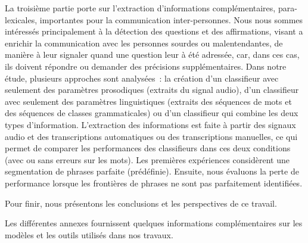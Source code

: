 \documentclass{style/these}
\begin{document}
La troisième partie porte sur l'extraction d'informations complémentaires, para-\linebreak lexicales, importantes pour la communication inter-personnes. 
Nous nous sommes intéressés principalement à la détection des questions et des affirmations, visant a enrichir la communication avec les personnes sourdes ou malentendantes, de manière à leur signaler quand une question leur à été adressée, car, dans ces cas, ils doivent répondre ou demander des précisions supplémentaires. 
Dans notre étude, plusieurs approches sont analysées~: la création d'un classifieur avec seulement des paramètres prosodiques (extraits du signal audio), d'un classifieur avec seulement des paramètres linguistiques (extraits des séquences de mots et des séquences de classes grammaticales) ou d'un classifieur qui combine les deux types d'information. 
L'extraction des informations est faite à partir des signaux audio et des transcriptions automatiques ou des transcriptions manuelles, ce qui permet de comparer les performances des classifieurs dans ces deux conditions (avec ou sans erreurs sur les mots). Les premières expériences considèrent une segmentation de phrases parfaite (prédéfinie). Ensuite, nous
évaluons la perte de performance lorsque les frontières de phrases ne sont pas parfaitement identifiées.

Pour finir, nous présentons les conclusions et les perspectives de ce travail.

Les différentes annexes fournissent quelques informations complémentaires sur les modèles et les outils utilisés dans nos travaux.
\end{document}
